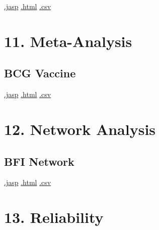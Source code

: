 \documentclass[
  letterpaper,
  DIV=11,
  numbers=noendperiod]{scrreprt}
\begin{document}
\textbar{}
\href{https://github.com/jasp-stats/jasp-data-library/raw/main/wine/wine.jasp}{.jasp}
\textbar{}
\href{https://htmlpreview.github.io/?https://github.com/jasp-stats/jasp-data-library/blob/main/wine/index.html}{.html}
\textbar{}
\href{https://raw.githubusercontent.com/jasp-stats/jasp-data-library/main/wine/wine.csv}{.csv}


\hypertarget{meta-analysis}{%
\chapter{11. Meta-Analysis}\label{meta-analysis}}

\hypertarget{bcg-vaccine}{%
\section{BCG Vaccine}\label{bcg-vaccine}}

\textbar{}
\href{https://github.com/jasp-stats/jasp-data-library/raw/main/BCG\%20Vaccine/BCG\%20Vaccine.jasp}{.jasp}
\textbar{}
\href{https://htmlpreview.github.io/?https://github.com/jasp-stats/jasp-data-library/blob/main/BCG\%20Vaccine/index.html}{.html}
\textbar{}
\href{https://raw.githubusercontent.com/jasp-stats/jasp-data-library/main/BCG\%20Vaccine/BCG\%20Vaccine.csv}{.csv}


\hypertarget{network-analysis}{%
\chapter{12. Network Analysis}\label{network-analysis}}

\hypertarget{bfi-network}{%
\section{BFI Network}\label{bfi-network}}

\textbar{}
\href{https://github.com/jasp-stats/jasp-data-library/raw/main/BFI\%20Network/BFI\%20Network.jasp}{.jasp}
\textbar{}
\href{https://htmlpreview.github.io/?https://github.com/jasp-stats/jasp-data-library/blob/main/BFI\%20Network/index.html}{.html}
\textbar{}
\href{https://raw.githubusercontent.com/jasp-stats/jasp-data-library/main/BFI\%20Network/BFI\%20Network.csv}{.csv}


\hypertarget{reliability}{%
\chapter{13. Reliability}\label{reliability}}
\end{document}
